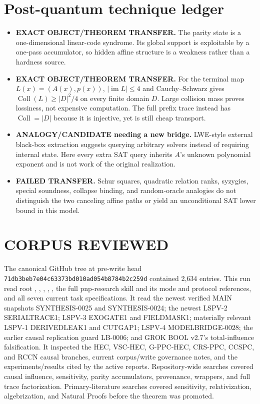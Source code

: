 \documentclass[11pt]{article}
\begin{document}
\section{Post-quantum technique ledger}
\begin{itemize}
\item \textbf{EXACT OBJECT/THEOREM TRANSFER.}  The parity state is a
one-dimensional linear-code syndrome.  Its global support is exploitable by a
one-pass accumulator, so hidden affine structure is a weakness rather than a
hardness source.
\item \textbf{EXACT OBJECT/THEOREM TRANSFER.}  For the terminal map
$L(x)=(A(x),p(x))$, $|\operatorname{im}L|\le4$ and Cauchy--Schwarz gives
$\operatorname{Coll}(L)\ge |D|^2/4$ on every finite domain $D$.  Large
collision mass proves lossiness, not expensive computation.  The full prefix
trace instead has $\operatorname{Coll}=|D|$ because it is injective, yet is
still cheap transport.
\item \textbf{ANALOGY/CANDIDATE needing a new bridge.}  LWE-style external
black-box extraction suggests querying arbitrary solvers instead of requiring
internal state.  Here every extra SAT query inherits $A$'s unknown polynomial
exponent and is not work of the original realization.
\item \textbf{FAILED TRANSFER.}  Schur squares, quadratic relation ranks,
syzygies, special soundness, collapse binding, and random-oracle analogies do
not distinguish the two canceling affine paths or yield an unconditional SAT
lower bound in this model.
\end{itemize}

\section{CORPUS REVIEWED}
The canonical GitHub tree at pre-write head
\texttt{71db3beb7e04c63373bd010ad054b8784b2c259d} contained 2,634 entries.
This run read root , , ,
, , the full pnp-research skill and its mode
and protocol references, and all seven current task specifications.  It read
the newest verified MAIN snapshots SYNTHESIS-0025 and SYNTHESIS-0024; the
newest LSPV-2 SERIALTRACE1; LSPV-3 EXOGATE1 and FIELDMASK1; materially relevant
LSPV-1 DERIVEDLEAK1 and CUTGAP1; LSPV-4 MODELBRIDGE-0028; the earlier causal
replication guard LB-0006; and GROK BOOL v2.7's total-influence falsification.
It inspected the HEC, VSC-HEC, G-PPC-HEC, CRS-PPC, CCSPC, and RCCN causal
branches, current corpus/write governance notes, and the experiments/results
cited by the active reports.  Repository-wide searches covered causal
influence, sensitivity, parity accumulators, provenance, wrappers, and full
trace factorization.  Primary-literature searches covered sensitivity,
relativization, algebrization, and Natural Proofs before the theorem was
promoted.
\end{document}
